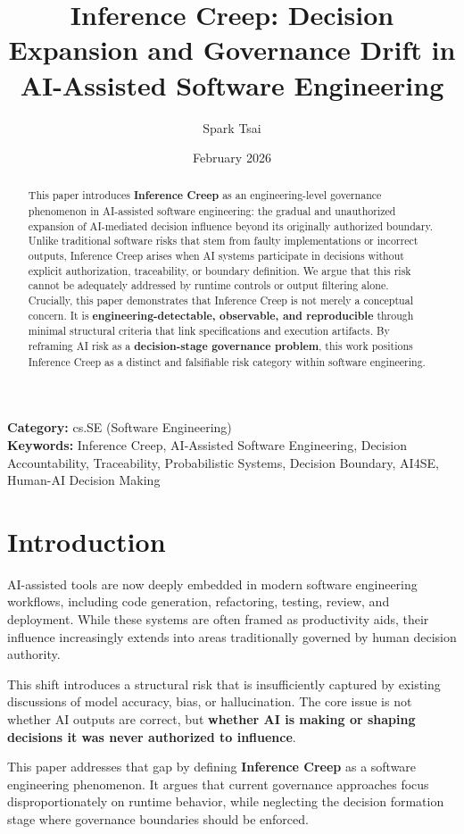 \documentclass[11pt, a4paper]{article}
\title{Inference Creep: Decision Expansion and Governance Drift in AI-Assisted Software Engineering}
\author{Spark Tsai}
\date{February 2026}
\begin{document}
\maketitle

\noindent\textbf{Category:} cs.SE (Software Engineering)\\
\textbf{Keywords:} Inference Creep, AI-Assisted Software Engineering, Decision Accountability, Traceability, Probabilistic Systems, Decision Boundary, AI4SE, Human-AI Decision Making

\begin{abstract}
This paper introduces \textbf{Inference Creep} as an engineering-level governance phenomenon in AI-assisted software engineering: the gradual and unauthorized expansion of AI-mediated decision influence beyond its originally authorized boundary. Unlike traditional software risks that stem from faulty implementations or incorrect outputs, Inference Creep arises when AI systems participate in decisions without explicit authorization, traceability, or boundary definition. We argue that this risk cannot be adequately addressed by runtime controls or output filtering alone. Crucially, this paper demonstrates that Inference Creep is not merely a conceptual concern. It is \textbf{engineering-detectable, observable, and reproducible} through minimal structural criteria that link specifications and execution artifacts. By reframing AI risk as a \textbf{decision-stage governance problem}, this work positions Inference Creep as a distinct and falsifiable risk category within software engineering.
\end{abstract}

\section{Introduction}
\label{sec:introduction}
AI-assisted tools are now deeply embedded in modern software engineering workflows, including code generation, refactoring, testing, review, and deployment. While these systems are often framed as productivity aids, their influence increasingly extends into areas traditionally governed by human decision authority.

This shift introduces a structural risk that is insufficiently captured by existing discussions of model accuracy, bias, or hallucination. The core issue is not whether AI outputs are correct, but \textbf{whether AI is making or shaping decisions it was never authorized to influence}. 

This paper addresses that gap by defining \textbf{Inference Creep} as a software engineering phenomenon. It argues that current governance approaches focus disproportionately on runtime behavior, while neglecting the decision formation stage where governance boundaries should be enforced.
\end{document}
